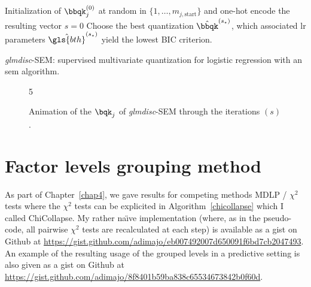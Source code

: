 \begin{algorithm}[H]
 Initialization of $\bbqk_j^{(0)}$ at random in $\{1, \dots, m_{j,\text{start}}\}$ and one-hot encode the resulting vector\;
 $s = 0$\;
 Choose the best quantization $\hat{\bbqk}^{(s_\star)}$, which associated \gls{lr} parameters $\hat{\gls{bth}}^{(s_\star)}$ yield the lowest BIC criterion.
 \caption{\label{SEM-disc} \textit{glmdisc}-SEM: supervised multivariate quantization for logistic regression with an \gls{sem} algorithm.}
\end{algorithm}

\begin{figure}[!h]
\begin{animateinline}[poster=first, controls=all, palindrome, autopause, autoresume, width=\textwidth, height=10cm]{5}
%
\end{animateinline}
\caption{\label{fig:animSEM} Animation of the $\bqk_j$ of \textit{glmdisc}-SEM through the iterations $(s)$.}
\end{figure}



\section{Factor levels grouping method} \label{app1:chicollapse}

As part of Chapter~\ref{chap4}, we gave results for competing methods MDLP / $\chi^2$ tests where the $\chi^2$ tests can be explicited in Algorithm~\ref{chicollapse} which I called ChiCollapse. My rather na{\"\i}ve implementation (where, as in the pseudo-code, all pairwise $\chi^2$ tests are recalculated at each step) is available as a gist on Github at \url{https://gist.github.com/adimajo/eb007492007d650091f6bd7cb2047493}. An example of the resulting usage of the grouped levels in a predictive setting is also given as a gist on Github at \url{https://gist.github.com/adimajo/8f8401b59ba838c65534673842b0f60d}.

